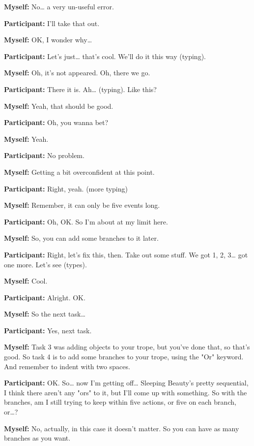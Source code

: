 \documentclass[11pt]{report}
\begin{document}
\begin{linenumbers}
\textbf{Myself:} No\ldots{} a very un-useful error.

\textbf{Participant:} I'll take that out.

\textbf{Myself:} OK, I wonder why\ldots{}

\textbf{Participant:} Let's just\ldots{} that's cool. We'll do it this way (typing).

\textbf{Myself:} Oh, it's not appeared. Oh, there we go.

\textbf{Participant:} There it is. Ah\ldots{} (typing). Like this?

\textbf{Myself:} Yeah, that should be good.

\textbf{Participant:} Oh, you wanna bet?

\textbf{Myself:} Yeah.

\textbf{Participant:} No problem.

\textbf{Myself:} Getting a bit overconfident at this point.

\textbf{Participant:} Right, yeah. (more typing)

\textbf{Myself:} Remember, it can only be five events long.

\textbf{Participant:} Oh, OK. So I'm about at my limit here.

\textbf{Myself:} So, you can add some branches to it later.

\textbf{Participant:} Right, let's fix this, then. Take out some stuff. We got 1, 2, 3\ldots{} got one more. Let's see (types).

\textbf{Myself:} Cool.

\textbf{Participant:} Alright. OK.

\textbf{Myself:} So the next task\ldots{}

\textbf{Participant:} Yes, next task.

\textbf{Myself:} Task 3 was adding objects to your trope, but you've done that, so that's good. So task 4 is to add some branches to your trope, using the "Or" keyword. And remember to indent with two spaces.

\textbf{Participant:} OK. So\ldots{} now I'm getting off\ldots{} Sleeping Beauty's pretty sequential, I think there aren't any "ors" to it, but I'll come up with something. So with the branches, am I still trying to keep within five actions, or five on each branch, or\ldots{}?

\textbf{Myself:} No, actually, in this case it doesn't matter. So you can have as many branches as you want.


\end{linenumbers}
\end{document}

